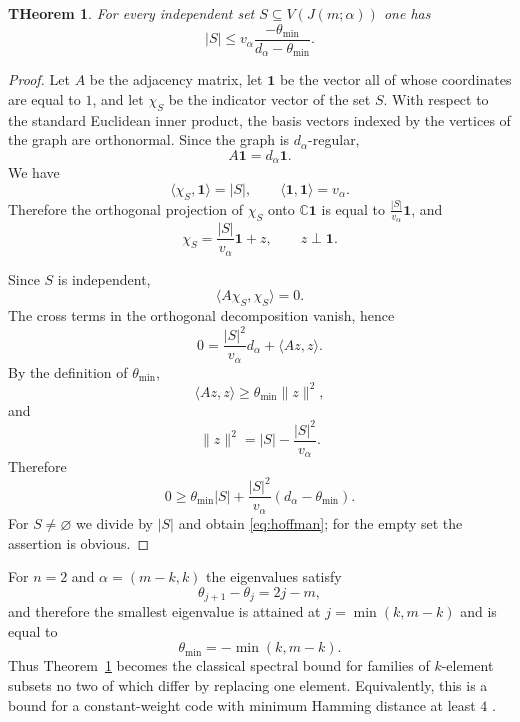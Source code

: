 \documentclass[12pt,reqno]{amsart}
\newtheorem{theorem}{THeorem}[section]
\begin{document}
\begin{theorem}\label{thm:hoffman}
For every independent set
$S\subseteq V(J(m;\alpha))$ one has
\begin{equation}\label{eq:hoffman}
|S|
\le
v_\alpha
\frac{-\theta_{\min}}{d_\alpha-\theta_{\min}}.
\end{equation}
\end{theorem}

\begin{proof}
Let $A$ be the adjacency matrix, let $\mathbf1$ be the vector all of whose
coordinates are equal to $1$, and let $\chi_S$ be the indicator vector of
the set $S$. With respect to the standard Euclidean inner product, the
basis vectors indexed by the vertices of the graph are orthonormal. Since
the graph is $d_\alpha$-regular,
$$
A\mathbf1=d_\alpha\mathbf1.
$$
We have
$$
\langle\chi_S,\mathbf1\rangle=|S|,
\qquad
\langle\mathbf1,\mathbf1\rangle=v_\alpha.
$$
Therefore the orthogonal projection of $\chi_S$ onto $\mathbb C\mathbf1$
is equal to $\frac{|S|}{v_\alpha}\mathbf1$, and
$$
\chi_S
=
\frac{|S|}{v_\alpha}\mathbf1+z,
\qquad
z\perp\mathbf1.
$$

Since $S$ is independent,
$$
\langle A\chi_S,\chi_S\rangle=0.
$$
The cross terms in the orthogonal decomposition vanish, hence
$$
0
=
\frac{|S|^2}{v_\alpha}d_\alpha+
\langle Az,z\rangle.
$$
By the definition of $\theta_{\min}$,
$$
\langle Az,z\rangle
\ge
\theta_{\min}\|z\|^2,
$$
and
$$
\|z\|^2
=
|S|-\frac{|S|^2}{v_\alpha}.
$$
Therefore
$$
0
\ge
\theta_{\min}|S|
+
\frac{|S|^2}{v_\alpha}
(d_\alpha-\theta_{\min}).
$$
For $S\ne\varnothing$ we divide by $|S|$ and obtain
\eqref{eq:hoffman}; for the empty set the assertion is obvious.
\end{proof}

For $n=2$ and $\alpha=(m-k,k)$ the eigenvalues satisfy
$$
\theta_{j+1}-\theta_j=2j-m,
$$
and therefore the smallest eigenvalue is attained at
$j=\min(k,m-k)$ and is equal to
$$
\theta_{\min}=-\min(k,m-k).
$$
Thus Theorem~\ref{thm:hoffman} becomes the classical spectral bound for
families of $k$-element subsets no two of which differ by replacing one
element. Equivalently, this is a bound for a constant-weight code with
minimum Hamming distance at least $4$
\cite{GodsilMeagher}.
\end{document}
